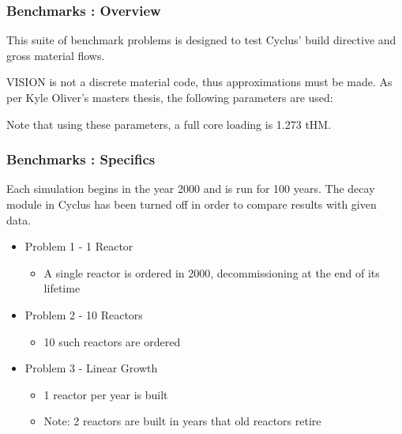 \begin{frame}[ctb!]
  \frametitle{Benchmarks : Overview}
  This suite of benchmark problems is designed to test Cyclus' build
  directive and gross material flows.
  
  \vspace {0.2cm}

  VISION is not a discrete material code, thus approximations must be made.
  As per Kyle Oliver's masters thesis, the following parameters are used:
  
  
  \vspace {0.2cm}

  Note that using these parameters, a full core loading is 1.273 tHM.
\end{frame}

\begin{frame}[ctb!]
  \frametitle{Benchmarks : Specifics}
  Each simulation begins in the year 2000 and is run for 100 years. The decay 
  module in Cyclus has been turned off in order to compare results with given
  data.
  \begin{itemize}
    \item Problem 1 - 1 Reactor
      \begin{itemize}
        \item A single reactor is ordered in 2000, decommissioning at the end
          of its lifetime
      \end{itemize}
    \item Problem 2 - 10 Reactors
      \begin{itemize}
        \item 10 such reactors are ordered
      \end{itemize}
    \item Problem 3 - Linear Growth
      \begin{itemize}
        \item 1 reactor per year is built
        \item Note: 2 reactors are built in years that old reactors retire
      \end{itemize}
  \end{itemize}
\end{frame}

